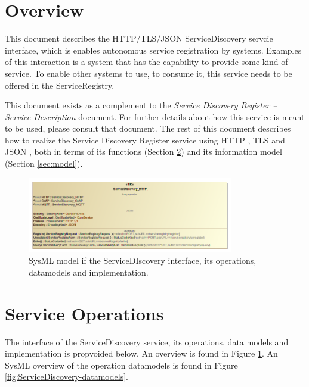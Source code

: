 \documentclass[a4paper]{arrowhead}
\begin{document}
\section{Overview}
\label{sec:overview}

This document describes the HTTP/TLS/JSON ServiceDiscovery servcie
interface, which is enables autonomous service registration by systems.
Examples of this interaction is a system that has the capability to provide some kind of service. To enable other systems to use, to consume it, this service needs to be offered in the ServiceRegistry.

This document exists as a complement to the \textit{Service Discovery Register -- Service Description} document.
For further details about how this service is meant to be used, please consult that document.
The rest of this document describes how to realize the Service Discovery Register service using HTTP \cite{fielding2014hypertext}, TLS \cite{rescorla2018transport} and JSON \cite{bray2014json}, both in terms of its functions (Section \ref{sec:functions}) and its information model (Section \ref{sec:model}).

\newpage

\begin{figure}[ht!]
  \centering
  \includegraphics[width=0.8\textwidth]{figures/ServiceDiscovery-IDD}
  \caption{SysML model if the ServiceDIscovery interface, its
    operations, datamodels and implementation.}
  \label{fig:ServiceDiscovery-IDD}
\end{figure}



\section{Service Operations}
\label{sec:functions}

The interface of the ServiceDiscovery service, its operations, data
models and implementation is propvoided below. An overview is found in
Figure \ref{fig:ServiceDiscovery-IDD}.  An SysML overview of the operation datamodels is found in Figure \ref{fig:ServiceDiscovery-datamodels}.
\end{document}
